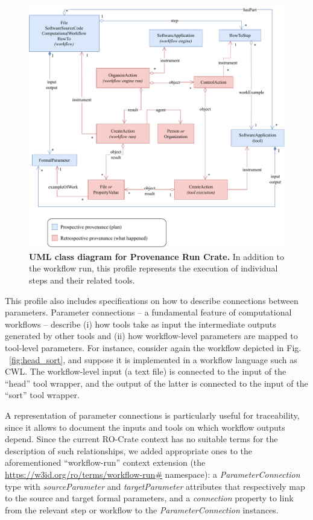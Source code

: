 \documentclass[10pt,letterpaper]{article}
\begin{document}
\begin{figure}[!h]
\includegraphics[width=\textwidth]{wrroc-figure3.drawio.pdf}
\caption{{\bf UML class diagram for Provenance Run Crate.}
In addition to the workflow run, this profile represents the execution of individual steps and their related tools.}
\label{fig:provenance_crate_er}
\end{figure}

This profile also includes specifications on how to describe connections between parameters.
Parameter connections -- a fundamental feature of computational workflows -- describe (i) how tools take as input the intermediate outputs generated by other tools and (ii) how workflow-level parameters are mapped to tool-level parameters.
For instance, consider again the workflow depicted in Fig. ~\ref{fig:head_sort},
and suppose it is implemented in a workflow language such as CWL. The workflow-level input (a text file) is connected to the input of the “head” tool wrapper, and the output of the latter is connected to the input of the “sort” tool wrapper.


A representation of parameter connections is particularly useful for traceability, since it allows to document the inputs and tools on which workflow outputs depend.
Since the current RO-Crate context has no suitable terms for the description of such relationships, 
we added appropriate ones to the aforementioned  ``workflow-run'' context extension (the \url{https://w3id.org/ro/terms/workflow-run\#} namespace):
a \emph{ParameterConnection} type with
\emph{sourceParameter} and \emph{targetParameter} attributes that respectively map to the source and target formal parameters, and a
\emph{connection} property to link from the relevant step or workflow to the \emph{ParameterConnection} instances.
\end{document}
